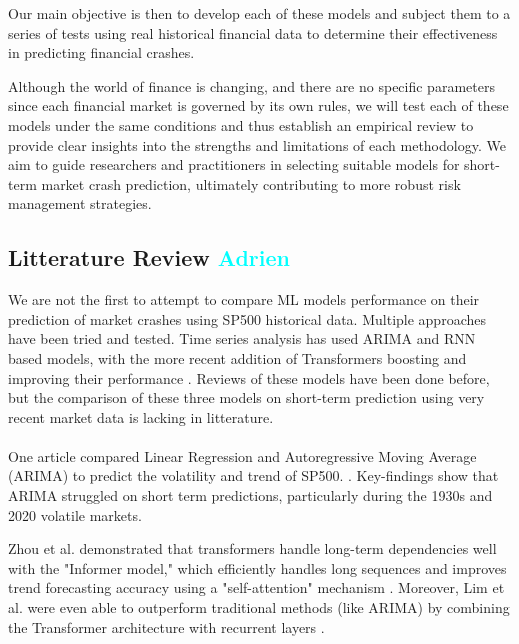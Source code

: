 \documentclass[12pt, letterpaper]{article}
\begin{document}
Our main objective is then to develop each of these models and subject them to a series of tests using real historical financial data to determine their effectiveness in predicting financial crashes. 

Although the world of finance is changing, and there are no specific parameters since each financial market is governed by its own rules, we will test each of these models under the same conditions and thus establish an empirical review to provide clear insights into the strengths and limitations of each methodology. We aim to guide researchers and practitioners in selecting suitable models for short-term market crash prediction, ultimately contributing to more robust risk management strategies.



\subsection*{Litterature Review \textcolor{cyan}{Adrien}}
    We are not the first to attempt to compare ML models performance on their prediction of market crashes using SP500 historical data. Multiple approaches have been tried and tested. Time series analysis has used ARIMA and RNN based models, with the more recent addition of Transformers boosting and improving their performance  \cite{Okpeke, Ahmed, ArunKumar}. Reviews of these models have been done before, but the comparison of these three models on short-term prediction using very recent market data is lacking in litterature. 
    \paragraph*{}
    One article compared Linear Regression and Autoregressive Moving Average (ARIMA) to predict the volatility and trend of SP500. \cite{sp500arimalstmregression}. 
    Key-findings show that ARIMA struggled on short term predictions, particularly during the 1930s and 2020 volatile markets. 
    
    Zhou et al. demonstrated that transformers handle long-term dependencies well with the "Informer model," which efficiently handles long sequences and improves trend forecasting accuracy using a "self-attention" mechanism \cite{zhou2021informer}. Moreover, Lim et al. were even able to outperform traditional methods (like ARIMA) by combining the Transformer architecture with recurrent layers \cite{lim2021temporal}. 
    
\end{document}
